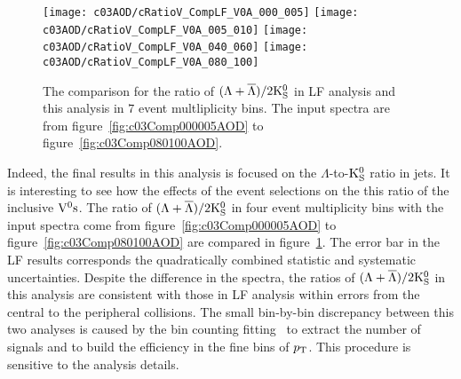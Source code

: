\begin{figure}[htb]
\begin{center}
\texttt{[image: c03AOD/cRatioV\_CompLF\_V0A\_000\_005]}
\texttt{[image: c03AOD/cRatioV\_CompLF\_V0A\_005\_010]}
\texttt{[image: c03AOD/cRatioV\_CompLF\_V0A\_040\_060]}
\texttt{[image: c03AOD/cRatioV\_CompLF\_V0A\_080\_100]}
\caption{The comparison for the ratio of $(\Lambda+\overline{\Lambda})/2{\rm K}_{\rm S}^{0}$
         in LF analysis and this analysis in $7$ event multliplicity bins.
         The input spectra are from figure~\ref{fig:c03Comp000005AOD} to
         figure~\ref{fig:c03Comp080100AOD}.}
\label{fig:c03CompRatioV0AOD}
\end{center}
\end{figure}

Indeed, the final results in this analysis is focused on
the $\Lambda$-to-${\rm K}_{\rm S}^{0}$ ratio in jets.
It is interesting to see how the effects of the event selections on
the this ratio of the inclusive ${\rm V}^{0}{\rm s}$.
The ratio of $(\Lambda+\overline{\Lambda})/2{\rm K}_{\rm S}^{0}$ in four event multiplicity bins
with the input spectra come from figure~\ref{fig:c03Comp000005AOD} to
figure~\ref{fig:c03Comp080100AOD} are compared
in figure~\ref{fig:c03CompRatioV0AOD}.
The error bar in the LF results corresponds the quadratically combined
statistic and systematic uncertainties.
Despite the difference in the spectra,
the ratios of $(\Lambda+\overline{\Lambda})/2{\rm K}_{\rm S}^{0}$ in this analysis are consistent
with those in LF analysis within errors from the central to the peripheral
collisions.
The small bin-by-bin discrepancy between this two analyses is caused by
the bin counting fitting~\cite{Ali2012:ana501} to extract the number of
signals and to build the efficiency in the fine bins of $p_{\rm T}$.
This procedure is sensitive to the analysis details.
